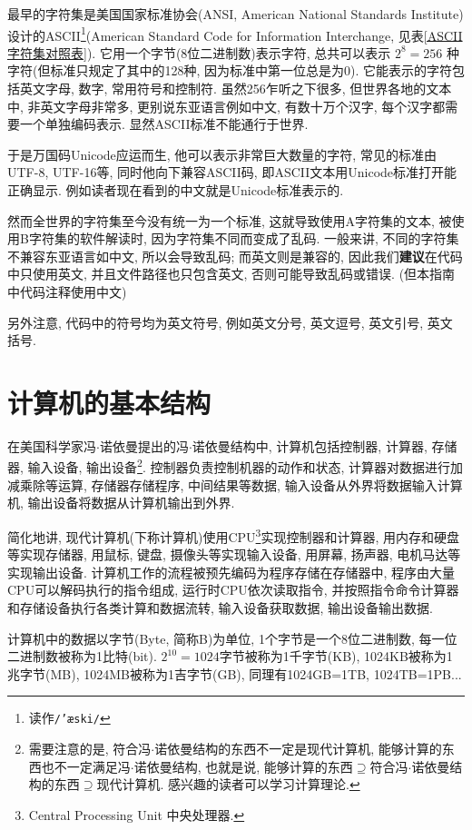         最早的字符集是美国国家标准协会(ANSI, American National Standards Institute)设计的ASCII\footnote{读作\texttt{/'æski/}}(American Standard Code for Information Interchange, 见表\ref{ASCII字符集对照表}). 它用一个字节(8位二进制数)表示字符, 总共可以表示 $ 2 ^ 8 = 256 $ 种字符(但标准只规定了其中的128种, 因为标准中第一位总是为0). 它能表示的字符包括英文字母, 数字, 常用符号和控制符. 虽然256乍听之下很多, 但世界各地的文本中, 非英文字母非常多, 更别说东亚语言例如中文, 有数十万个汉字, 每个汉字都需要一个单独编码表示. 显然ASCII标准不能通行于世界.

        于是万国码Unicode应运而生, 他可以表示非常巨大数量的字符, 常见的标准由UTF-8, UTF-16等, 同时他向下兼容ASCII码, 即ASCII文本用Unicode标准打开能正确显示. 例如读者现在看到的中文就是Unicode标准表示的.

        然而全世界的字符集至今没有统一为一个标准, 这就导致使用A字符集的文本, 被使用B字符集的软件解读时, 因为字符集不同而变成了乱码. 一般来讲, 不同的字符集不兼容东亚语言如中文, 所以会导致乱码; 而英文则是兼容的, 因此我们\textbf{建议}在代码中只使用英文, 并且文件路径也只包含英文, 否则可能导致乱码或错误. (但本指南中代码注释使用中文)

        另外注意, 代码中的符号均为英文符号, 例如英文分号, 英文逗号, 英文引号, 英文括号.

    \section{计算机的基本结构} \label{计算机的基本结构}
        在美国科学家冯$\cdot$诺依曼提出的冯$\cdot$诺依曼结构中, 计算机包括控制器, 计算器, 存储器, 输入设备, 输出设备\footnote{需要注意的是, 符合冯$\cdot$诺依曼结构的东西不一定是现代计算机, 能够计算的东西也不一定满足冯$\cdot$诺依曼结构, 也就是说, 能够计算的东西$\supseteq$符合冯$\cdot$诺依曼结构的东西$\supseteq$现代计算机. 感兴趣的读者可以学习计算理论.}. 控制器负责控制机器的动作和状态, 计算器对数据进行加减乘除等运算, 存储器存储程序, 中间结果等数据, 输入设备从外界将数据输入计算机, 输出设备将数据从计算机输出到外界.
        
        简化地讲, 现代计算机(下称计算机)使用CPU\footnote{Central Processing Unit 中央处理器.}实现控制器和计算器, 用内存和硬盘等实现存储器, 用鼠标, 键盘, 摄像头等实现输入设备, 用屏幕, 扬声器, 电机马达等实现输出设备. 计算机工作的流程被预先编码为程序存储在存储器中, 程序由大量CPU可以解码执行的指令组成, 运行时CPU依次读取指令, 并按照指令命令计算器和存储设备执行各类计算和数据流转, 输入设备获取数据, 输出设备输出数据.

        计算机中的数据以字节(Byte, 简称B)为单位, 1个字节是一个8位二进制数, 每一位二进制数被称为1比特(bit). $ 2^{10} = 1024 $字节被称为1千字节(KB), 1024KB被称为1兆字节(MB), 1024MB被称为1吉字节(GB), 同理有1024GB=1TB, 1024TB=1PB...

